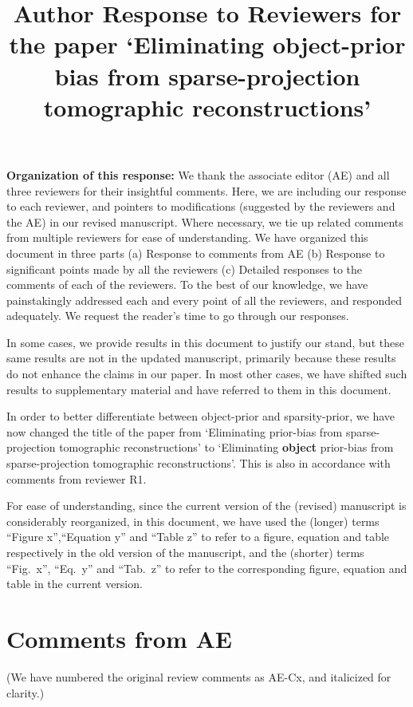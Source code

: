 \documentclass{article}
\title{Author Response to Reviewers for the paper `Eliminating object-prior bias from sparse-projection tomographic reconstructions'}
\begin{document}
\maketitle

\textbf{Organization of this response:} We thank the associate editor (AE) and all three reviewers for their insightful comments. Here, we are including our response to each reviewer, and pointers to modifications (suggested by the reviewers and the AE) in our revised manuscript.  Where necessary, we tie up related comments from multiple reviewers for ease of understanding.  We have organized this document in three parts (a) Response to comments from AE (b) Response to significant points made by all the reviewers (c) Detailed  responses to the comments of each of the reviewers. To the best of our knowledge, we have painstakingly addressed each and every point of all the reviewers, and responded adequately.  We request the reader's time to go through our responses.

In some cases, we provide results in this document to justify our stand, but these same results are not in the updated manuscript, primarily because these results do not enhance the claims in our paper. In most other cases, we have shifted such results to supplementary material and have referred to them in this document.

In order to better differentiate between object-prior and sparsity-prior, we have now changed the title of the paper from `Eliminating prior-bias from sparse-projection tomographic reconstructions' to `Eliminating \textbf{object} prior-bias from sparse-projection tomographic reconstructions'. This is also in accordance with comments from reviewer R1.

For ease of understanding, since the current version of the (revised) manuscript is considerably reorganized, in this document, we have used the (longer) terms ``Figure x'',``Equation y'' and ``Table z''  to refer to a figure, equation and table respectively in the old version of the manuscript, and the (shorter) terms ``Fig.~x'', ``Eq.~y'' and ``Tab.~z'' to refer to the corresponding figure, equation and table in the current version. 

\section{Comments from AE}

(We have numbered the original review comments as AE-Cx, and italicized for clarity.)\\
\end{document}
